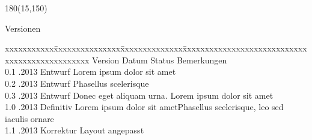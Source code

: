 
\begin{textblock}{180}(15,150)
\color{black}
\begin{huge}
Versionen
\end{huge}
\vspace{10mm}

\fontsize{10pt}{18pt}\selectfont
\begin{tabbing}
xxxxxxxxxxx\=xxxxxxxxxxxxxxx\=xxxxxxxxxxxxxx\=xxxxxxxxxxxxxxxxxxxxxxxxxxxxxxxxxxxxxxxxxxxxxxx \kill
Version	\> Datum	\> Status		\> Bemerkungen		\\
0.1	.2013	\> Entwurf		\> Lorem ipsum dolor sit amet	\\	
0.2	.2013	\> Entwurf		\> Phasellus scelerisque	\\ 
0.3	.2013	\> Entwurf		\> Donec eget aliquam urna. Lorem ipsum dolor sit amet	\\ 
1.0	.2013	\> Definitiv	\> Lorem ipsum dolor sit ametPhasellus scelerisque, leo sed iaculis ornare 	\\ 
1.1	.2013	\> Korrektur	\> Layout angepasst	\\
\end{tabbing}

\end{textblock}
